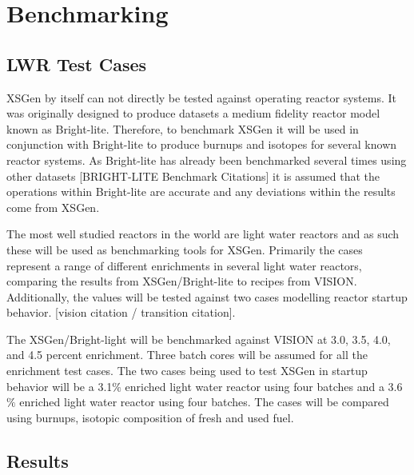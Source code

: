 \documentclass{article}
\begin{document}
\section{Benchmarking}
\subsection{LWR Test Cases}
XSGen by itself can not directly be tested against operating reactor systems. It was originally designed to produce datasets a medium fidelity reactor model known as Bright-lite. Therefore, to benchmark XSGen it will be used in conjunction with Bright-lite to produce burnups and isotopes for several known reactor systems.  As Bright-lite has already been benchmarked several times using other datasets [BRIGHT-LITE Benchmark Citations] it is assumed that the operations within Bright-lite are accurate and any deviations within the results come from XSGen. 

The most well studied reactors in the world are light water reactors and as such these will be used as benchmarking tools for XSGen. Primarily the cases represent a range of different enrichments in several light water reactors, comparing the results from XSGen/Bright-lite to recipes from VISION. Additionally, the values will be tested against two cases modelling reactor startup behavior.  [vision citation / transition citation].

The XSGen/Bright-light will be benchmarked against VISION at 3.0, 3.5, 4.0, and 4.5 percent enrichment. Three batch cores will be assumed for all the enrichment test cases. 
The two cases being used to test XSGen in startup behavior will be a 3.1$\%$ enriched light water reactor using four batches and a 3.6$\%$ enriched light water reactor using four batches. The cases will be compared using burnups, isotopic composition of fresh and used fuel.

\subsection{Results}
\end{document}
